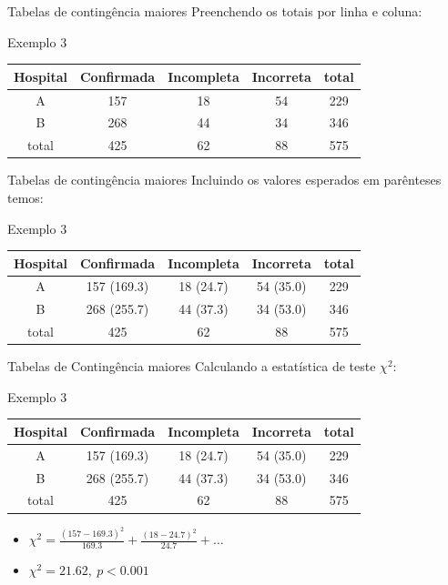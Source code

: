 \documentclass{beamer}
\begin{document}
\begin{frame}{Tabelas de contingência maiores}
  Preenchendo os totais por linha e coluna:
  \begin{exampleblock}{Exemplo 3}
    \begin{tabular}{c|c|c|c|c}
      Hospital & Confirmada & Incompleta &
      Incorreta & total\\
      \hline
      A & 157 & 18 & 54 & 229\\
      \hline
      B & 268 & 44 & 34 & 346\\
      \hline
      total & 425 & 62 & 88 & 575\\
    \end{tabular}
  \end{exampleblock}
\end{frame}

\begin{frame}{Tabelas de contingência maiores}
  Incluindo os valores esperados em parênteses temos:
  \begin{exampleblock}{Exemplo 3}
    \begin{tabular}{c|c|c|c|c}
      Hospital & Confirmada & Incompleta &
      Incorreta & total\\
      \hline
      A & 157 (169.3) & 18 (24.7) & 54 (35.0) & 229\\
      \hline
      B & 268 (255.7) & 44 (37.3) & 34 (53.0) & 346\\
      \hline
      total & 425 & 62 & 88 & 575\\
    \end{tabular}
  \end{exampleblock}
\end{frame}

\begin{frame}{Tabelas de Contingência maiores}
  \small
  Calculando a estatística de teste $\chi^2$:

  \bigskip
  \begin{exampleblock}{Exemplo 3}
    \begin{tabular}{c|c|c|c|c}
      \footnotesize
      Hospital & Confirmada & Incompleta &
      Incorreta & total\\
      \hline
      A & 157 (169.3) & 18 (24.7) & 54 (35.0) & 229\\
      \hline
      B & 268 (255.7) & 44 (37.3) & 34 (53.0) & 346\\
      \hline
      total & 425 & 62 & 88 & 575\\
    \end{tabular}
  \end{exampleblock}
  \begin{itemize}
    \scriptsize
  \item $\chi^2 = \frac{(157 - 169.3)^2}{169.3} + \frac{(18-24.7)^2}{24.7}  + \ldots$
    \bigskip
    \small
  \item $\chi^2 = 21.62,\ p<0.001$
  \end{itemize}
\end{frame}
\end{document}
